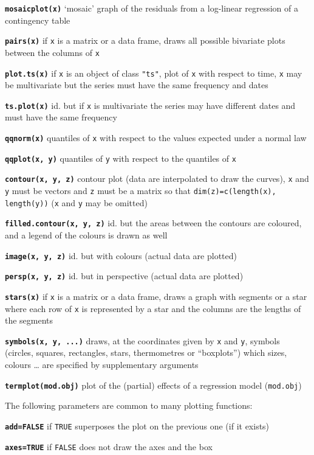 \documentclass[10pt,landscape]{article}
\newcommand{\code}{\texttt}
\newcommand{\bcode}[1]{\texttt{\textbf{#1}}}
\newcommand\F{\code{FALSE}}
\newcommand\T{\code{TRUE}}
\begin{document}
\begin{multicols*}{3}
\bcode{mosaicplot(x)}  `mosaic' graph of the residuals from a log-linear regression of a contingency table

\bcode{pairs(x)}  if \code{x} is a matrix or a data frame, draws all possible bivariate plots between the columns of \code{x}

\bcode{plot.ts(x)}  if \code{x} is an object of class \code{"ts"}, plot of \code{x} with respect to time, \code{x}  may be multivariate but the series must have the same frequency and dates

\bcode{ts.plot(x)}  id. but if \code{x} is multivariate the series may have different dates and must have the same frequency

\bcode{qqnorm(x)}  quantiles of \code{x} with respect to the values expected under a normal law

\bcode{qqplot(x, y)}  quantiles of \code{y} with respect to the quantiles of \code{x}

\bcode{contour(x, y, z)}  contour plot (data are interpolated to draw the curves), \code{x} and \code{y} must be vectors and \code{z} must be a matrix so that \code{dim(z)=c(length(x), length(y))} (\code{x} and \code{y} may be omitted)

\bcode{filled.contour(x, y, z)}  id. but the areas between the contours are coloured, and a legend of the colours is drawn as well

\bcode{image(x, y, z)}  id. but with colours (actual data are plotted)

\bcode{persp(x, y, z)}  id. but in perspective (actual data are plotted)

\bcode{stars(x)}  if \code{x} is a matrix or a data frame, draws a graph with segments or a star where each row of \code{x} is represented by a star and the columns are the lengths of the segments

\bcode{symbols(x, y, ...)}  draws, at the coordinates given by \code{x} and \code{y}, symbols (circles, squares, rectangles, stars, thermometres or ``boxplots'') which sizes, colours \ldots{} are specified by supplementary arguments

\bcode{termplot(mod.obj)}  plot of the (partial) effects of a regression model (\code{mod.obj})

The following parameters are common to many plotting functions:

\bcode{add=FALSE}  if \T{} superposes the plot on the previous one (if it exists)

\bcode{axes=TRUE}  if \F{} does not draw the axes and the box


\end{multicols*}
\end{document}
